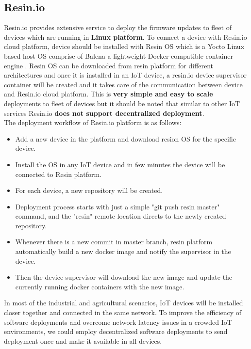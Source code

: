 \documentclass[12pt]{article}
\begin{document}
\subsection{Resin.io}
Resin.io provides extensive service to deploy the firmware updates to fleet of devices which are running in \textbf{Linux platform}. To connect a device with Resin.io cloud platform, device should be installed with Resin OS which is a Yocto Linux based host OS comprise of Balena a lightweight Docker-compatible container engine \cite{misc07}. Resin OS can be downloaded from resin platform for different architectures and once it is installed in an IoT device, a resin.io device supervisor container will be created and it takes care of the communication between device and Resin.io cloud platform. This is \textbf{very simple and easy to scale} deployments to fleet of devices but it should be noted that similar to other IoT services Resin.io \textbf{does not support decentralized deployment}.\\

\noindent The deployment workflow of Resin.io platform is as follows:\cite{misc08}

\begin{itemize}
	\item Add a new device in the platform and download resion OS for the specific device.
	\item Install the OS in any IoT device and in few minutes the device will be connected to Resin platform.
	\item For each device, a new repository will be created. 
	\item Deployment process starts with just a simple "git push resin master" command, and the "resin" remote location directs to the newly created repository.
	\item Whenever there is a new commit in master branch, resin platform automatically build a new docker image and notify the supervisor in the device.
	\item Then the device supervisor will download the new image and update the currently running docker containers with the new image.	
\end{itemize}

In most of the industrial and agricultural scenarios, IoT devices will be installed closer together and connected in the same network. To improve the efficiency of software deployments and overcome network latency issues in a crowded IoT environments, we could employ decentralized software deployments to send deployment once and make it available in all devices. 
\end{document}

